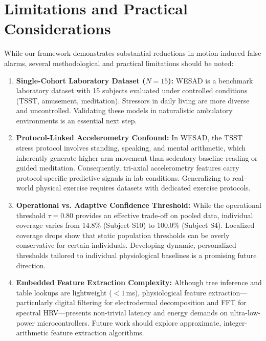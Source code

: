 \documentclass[conference]{IEEEtran}
\begin{document}
\section{Limitations and Practical Considerations}
While our framework demonstrates substantial reductions in motion-induced false alarms, several methodological and practical limitations should be noted:
\begin{enumerate}
    \item \textbf{Single-Cohort Laboratory Dataset ($N=15$):} WESAD is a benchmark laboratory dataset with 15 subjects evaluated under controlled conditions (TSST, amusement, meditation). Stressors in daily living are more diverse and uncontrolled. Validating these models in naturalistic ambulatory environments is an essential next step.
    \item \textbf{Protocol-Linked Accelerometry Confound:} In WESAD, the TSST stress protocol involves standing, speaking, and mental arithmetic, which inherently generate higher arm movement than sedentary baseline reading or guided meditation. Consequently, tri-axial accelerometry features carry protocol-specific predictive signals in lab conditions. Generalizing to real-world physical exercise requires datasets with dedicated exercise protocols.
    \item \textbf{Operational vs. Adaptive Confidence Threshold:} While the operational threshold $\tau = 0.80$ provides an effective trade-off on pooled data, individual coverage varies from 14.8\% (Subject S10) to 100.0\% (Subject S4). Localized coverage drops show that static population thresholds can be overly conservative for certain individuals. Developing dynamic, personalized thresholds tailored to individual physiological baselines is a promising future direction.
    \item \textbf{Embedded Feature Extraction Complexity:} Although tree inference and table lookups are lightweight ($< 1$\,ms), physiological feature extraction—particularly digital filtering for electrodermal decomposition and FFT for spectral HRV—presents non-trivial latency and energy demands on ultra-low-power microcontrollers. Future work should explore approximate, integer-arithmetic feature extraction algorithms.
\end{enumerate}

\end{document}
